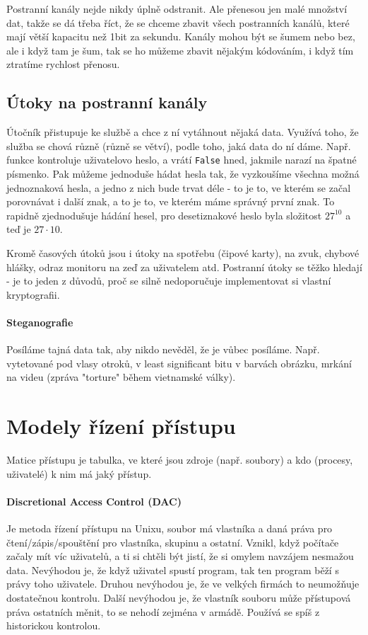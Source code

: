 Postranní kanály nejde nikdy úplně odstranit. Ale přenesou jen malé množství dat, takže se dá třeba říct, že se chceme zbavit všech postranních kanálů, které mají větší kapacitu než 1bit za sekundu. Kanály mohou být se šumem nebo bez, ale i když tam je šum, tak se ho můžeme zbavit nějakým kódováním, i když tím ztratíme rychlost přenosu.


\subsection{Útoky na postranní kanály}

Útočník přistupuje ke službě a chce z ní vytáhnout nějaká data. Využívá toho, že služba se chová různě (různě se větví), podle toho, jaká data do ní dáme. Např. funkce kontroluje uživatelovo heslo, a vrátí \texttt{False} hned, jakmile narazí na špatné písmenko. Pak můžeme jednoduše hádat hesla tak, že vyzkoušíme všechna možná jednoznaková hesla, a jedno z nich bude trvat déle - to je to, ve kterém se začal porovnávat i další znak, a to je to, ve kterém máme správný  první znak. To rapidně zjednodušuje hádání hesel, pro desetiznakové heslo byla složitost $27^{10}$ a teď je $27\cdot 10$.

Kromě časových útoků jsou i útoky na spotřebu (čipové karty), na zvuk, chybové hlášky, odraz monitoru na zeď za uživatelem atd. Postranní útoky se těžko hledají - je to jeden z důvodů, proč se silně nedoporučuje implementovat si vlastní kryptografii. 

\paragraph{Steganografie} Posíláme tajná data tak, aby nikdo nevěděl, že je vůbec posíláme. Např. vytetované pod vlasy otroků, v least significant bitu v barvách obrázku, mrkání na videu (zpráva "torture" během vietnamské války).




\section{Modely řízení přístupu}

Matice přístupu je tabulka, ve které jsou zdroje (např. soubory) a kdo (procesy, uživatelé) k nim má jaký přístup.

\paragraph{Discretional Access Control (DAC)} Je metoda řízení přístupu na Unixu, soubor má vlastníka a daná práva pro čtení/zápis/spouštění pro vlastníka, skupinu a ostatní. Vznikl, když počítače začaly mít víc uživatelů, a ti si chtěli být jistí, že si omylem navzájem nesmažou data. Nevýhodou je, že když uživatel spustí program, tak ten program běží s právy toho uživatele. Druhou nevýhodou je, že ve velkých firmách to neumožňuje dostatečnou kontrolu. Další nevýhodou je, že vlastník souboru může přístupová práva ostatních měnit, to se nehodí zejména v armádě. Používá se spíš z historickou kontrolou.

